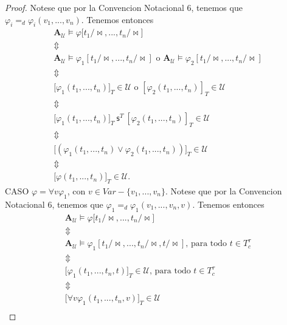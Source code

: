 \begin{proof}
Notese que por la Convencion Notacional 6, tenemos que $\varphi
_{i}=_{d}\varphi _{i}(v_{1},...,v_{n})$. Tenemos entonces%
\begin{equation*}
\begin{array}{c}
\mathbf{A}_{\mathcal{U}}\models \varphi \lbrack t_{1}/\mathrm{\bowtie }%
,...,t_{n}/\mathrm{\bowtie }] \\ 
\Updownarrow \\ 
\mathbf{A}_{\mathcal{U}}\models \varphi _{1}[t_{1}/\mathrm{\bowtie }%
,...,t_{n}/\mathrm{\bowtie }]\text{ o }\mathbf{A}_{\mathcal{U}}\models
\varphi _{2}[t_{1}/\mathrm{\bowtie },...,t_{n}/\mathrm{\bowtie }] \\ 
\Updownarrow \\ 
\lbrack \varphi _{1}(t_{1},...,t_{n})]_{T}\in \mathcal{U}\text{ o }[\varphi
_{2}(t_{1},...,t_{n})]_{T}\in \mathcal{U} \\ 
\Updownarrow \\ 
\lbrack \varphi _{1}(t_{1},...,t_{n})]_{T}\ \mathsf{s}^{T}\mathsf{\ }%
[\varphi _{2}(t_{1},...,t_{n})]_{T}\in \mathcal{U} \\ 
\Updownarrow \\ 
\lbrack \left( \varphi _{1}(t_{1},...,t_{n})\vee \varphi
_{2}(t_{1},...,t_{n})\right) ]_{T}\in \mathcal{U} \\ 
\Updownarrow \\ 
\lbrack \varphi (t_{1},...,t_{n})]_{T}\in \mathcal{U}.%
\end{array}%
\end{equation*}%
CASO $\varphi =\forall v\varphi _{1}$, con $v\in Var-\{v_{1},...,v_{n}\}$.
Notese que por la Convencion Notacional 6, tenemos que $\varphi
_{1}=_{d}\varphi _{1}(v_{1},...,v_{n},v)$. Tenemos entonces%
\begin{equation*}
\begin{array}{c}
\mathbf{A}_{\mathcal{U}}\models \varphi \lbrack t_{1}/\mathrm{\bowtie }%
,...,t_{n}/\mathrm{\bowtie }] \\ 
\Updownarrow \\ 
\mathbf{A}_{\mathcal{U}}\models \varphi _{1}[t_{1}/\mathrm{\bowtie }%
,...,t_{n}/\mathrm{\bowtie },t/\mathrm{\bowtie }]\text{, para todo }t\in
T_{c}^{\tau } \\ 
\Updownarrow \\ 
\lbrack \varphi _{1}(t_{1},...,t_{n},t)]_{T}\in \mathcal{U}\text{, para todo 
}t\in T_{c}^{\tau } \\ 
\Updownarrow \\ 
\lbrack \forall v\varphi _{1}(t_{1},...,t_{n},v)]_{T}\in \mathcal{U} \\ 

\end{array}
\end{equation*}
\end{proof}
